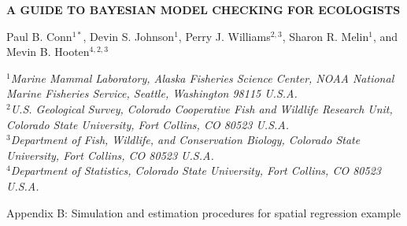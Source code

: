 \documentclass[12pt,fleqn]{article}
\begin{document}
\begin{center} \bf {\large A GUIDE TO BAYESIAN MODEL CHECKING FOR ECOLOGISTS}

\vspace{0.7cm}
Paul B. Conn$^{1*}$, Devin S. Johnson$^1$, Perry J. Williams$^{2,3}$, Sharon R. Melin$^1$, and Mevin
    B. Hooten$^{4,2,3}$
\end{center}
\vspace{0.5cm}

\rm
\small

\it $^1$Marine Mammal Laboratory, Alaska Fisheries Science Center,
NOAA National Marine Fisheries Service,
Seattle, Washington 98115 U.S.A.\\

\it $^2$U.S. Geological Survey, Colorado Cooperative Fish and Wildlife Research Unit, Colorado State University, Fort Collins, CO 80523 U.S.A.\\

\it $^3$Department of Fish, Wildlife, and Conservation Biology, Colorado State University, Fort Collins, CO 80523 U.S.A.\\

\it $^4$Department of Statistics, Colorado State University, Fort Collins, CO 80523 U.S.A.\\

\raggedbottom
\vspace{.5in}

\rm
Appendix B: Simulation and estimation procedures for spatial regression example
\bigskip

\vspace{.3in}

\doublespacing
\end{document}
